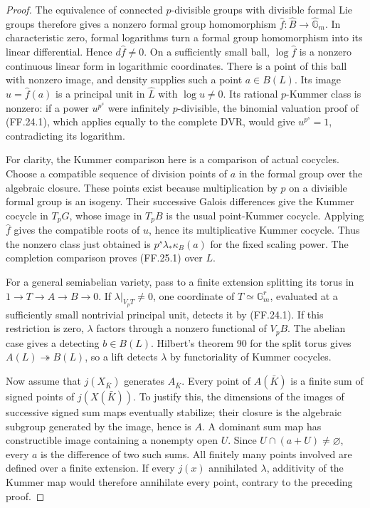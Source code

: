 \begin{proof}
The equivalence of connected \(p\)-divisible groups with
divisible formal Lie groups
\citep[Section~2.2, Proposition~1]{FF_Tate1967} therefore
gives a nonzero formal group homomorphism
\(\widehat f:\widehat B\to\widehat{\mathbb G}_m\).
In characteristic zero, formal logarithms turn a formal
group homomorphism into its linear differential. Hence
\(d\widehat f\ne0\). On a sufficiently small ball,
\(\log\widehat f\) is a nonzero continuous linear form
in logarithmic coordinates. There is a point of this ball
with nonzero image, and density supplies such a point
\(a\in B(L)\). Its image \(u=\widehat f(a)\) is a
principal unit in \(\widehat L\) with \(\log u\ne0\).
Its rational \(p\)-Kummer class is nonzero: if a power
\(u^{p^s}\) were infinitely \(p\)-divisible, the binomial
valuation proof of (FF.24.1), which applies equally to
the complete DVR, would give \(u^{p^s}=1\), contradicting
its logarithm.

For clarity, the Kummer comparison here is a comparison of
actual cocycles. Choose a compatible sequence of division
points of \(a\) in the formal group over the algebraic
closure. These points exist because multiplication by
\(p\) on a divisible formal group is an isogeny. Their
successive Galois differences give the Kummer cocycle
in \(T_pG\), whose image in \(T_pB\) is the usual
point-Kummer cocycle. Applying \(\widehat f\) gives
the compatible roots of \(u\), hence its multiplicative
Kummer cocycle. Thus the nonzero class just obtained is
\(p^s\lambda_*\kappa_B(a)\) for the fixed scaling power.
The completion comparison proves (FF.25.1) over \(L\).

For a general semiabelian variety, pass to a finite
extension splitting its torus in
\(1\to T\to A\to B\to0\). If \(\lambda|_{V_pT}\ne0\),
one coordinate of \(T\simeq\mathbb G_m^r\), evaluated
at a sufficiently small nontrivial principal unit, detects
it by (FF.24.1). If this restriction is zero, \(\lambda\)
factors through a nonzero functional of \(V_pB\).
The abelian case gives a detecting \(b\in B(L)\).
Hilbert's theorem 90 for the split torus gives
\(A(L)\twoheadrightarrow B(L)\), so a lift detects
\(\lambda\) by functoriality of Kummer cocycles.

Now assume that \(j(X_{\bar K})\) generates \(A_{\bar K}\).
Every point of \(A(\bar K)\) is a finite sum of signed
points of \(j(X(\bar K))\). To justify this, the dimensions
of the images of successive signed sum maps eventually
stabilize; their closure is the algebraic subgroup
generated by the image, hence is \(A\). A dominant sum
map has constructible image containing a nonempty open
\(U\). Since \(U\cap(a+U)\ne\varnothing\), every
\(a\) is the difference of two such sums. All finitely
many points involved are defined over a finite extension.
If every \(j(x)\) annihilated \(\lambda\), additivity
of the Kummer map would therefore annihilate every
point, contrary to the preceding proof.


\end{proof}
